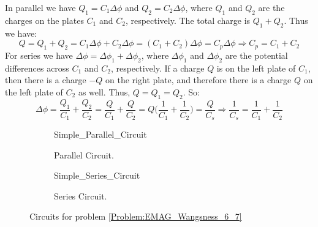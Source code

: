 \documentclass[crop=false,class=book,oneside]{standalone}
\begin{document}
            In parallel we have $Q_{1}=C_{1}\Delta\phi$
            and $Q_{2}=C_{2}\Delta\phi$,
            where $Q_{1}$ and $Q_{2}$ are the charges on the
            plates $C_{1}$ and $C_{2}$, respectively.
            The total charge is $Q_{1}+Q_{2}$. Thus we have:
            \begin{equation*}
                Q=Q_{1}+Q_{2}
                 =C_{1}\Delta\phi+C_{2}\Delta\phi
                 =(C_{1}+C_{2})\Delta\phi
                 =C_{p}\Delta\phi
                \Rightarrow{C_{p}}=C_{1}+C_{2}
            \end{equation*}
            For series we have
            $\Delta\phi=\Delta\phi_{1}+\Delta\phi_{2}$,
            where $\Delta\phi_{1}$ and $\Delta\phi_{2}$
            are the potential differences across $C_{1}$ and $C_{2}$,
            respectively. If a charge $Q$ is on the left plate
            of $C_{1}$, then there is a charge $-Q$ on the right
            plate, and therefore there is a charge $Q$ on the
            left plate of $C_{2}$ as well. Thus, $Q=Q_{1}=Q_{2}$.
            So:
            \begin{equation*}
                \Delta\phi=\frac{Q_{1}}{C_{1}}+\frac{Q_{2}}{C_{2}}
                =\frac{Q}{C_{1}}+\frac{Q}{C_{2}}
                =Q\big(\frac{1}{C_{1}}+\frac{1}{C_{2}}\big)
                =\frac{Q}{C_{s}}
                \Rightarrow\frac{1}{C_{s}}
                =\frac{1}{C_{1}}+\frac{1}{C_{2}}
            \end{equation*}
            \begin{figure}
                \centering
                \captionsetup{type=figure}
                \begin{subfigure}[b]{0.49\textwidth}
                    \centering
                    \captionsetup{type=figure}
                    
                              {Simple_Parallel_Circuit}
                    \caption{Parallel Circuit.}
                    \label{fig:EMAG_Parallel_Circuit}
                \end{subfigure}
                \begin{subfigure}[b]{0.49\textwidth}
                    \centering
                    \captionsetup{type=figure}
                    
                              {Simple_Series_Circuit}
                    \caption{Series Circuit.}
                    \label{fig:EMAG_Series_Circuit}
                \end{subfigure}
                \caption{%
                    Circuits for problem
                    \ref{Problem:EMAG_Wangsness_6_7}
                }
                \label{fig:EMAG_Wangsness_6_7}
            \end{figure}
\end{document}
